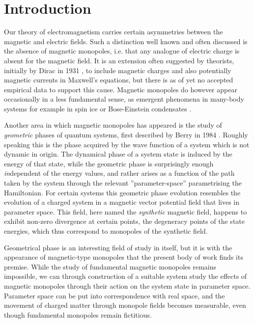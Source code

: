 \documentclass[main.tex]{subfiles}
\begin{document}
\section{Introduction}
\label{sec:introduction}
Our theory of electromagnetism carries certain asymmetries between the magnetic and
electric fields. Such a distinction well known and often discussed is the absence of
magnetic monopoles, i.e. that
any analogue of electric charge is absent for the magnetic field. It is an extension often
suggested by theorists, initially by Dirac in 1931 \cite{dirac}, to include magnetic
charges and also potentially magnetic currents in Maxwell's equations, but
there is as of yet no accepted empirical data to support this cause. Magnetic monopoles do
however appear occasionally in a less fundamental sense, as emergent phenomena in
many-body systems for example in
spin ice \cite{castelnovo} or Bose-Einstein condensates \cite{ray}. 

Another area in which magnetic monopoles has appeared is the study of \textit{geometric}
phases of quantum systems, first described by Berry in 1984 \cite{berry1984}. Roughly
speaking this is the phase acquired by the wave function of a system which is not dynamic
in origin. The dynamical phase of a system state is induced by the energy of that state,
while the geometric phase is surprisingly enough \textit{in}dependent of the energy values,
and rather arises as a function of the path taken by the system through the relevant
''parameter-space'' parametrising the Hamiltonian. For certain systems this geometric phase evolution
resembles the %
evolution of a charged system in a magnetic vector potential field that lives in 
parameter space. This field, here named the \textit{synthetic} magnetic field, happens to
exhibit non-zero divergence at certain points, the degeneracy points of the state energies,
which thus correspond to monopoles of the synthetic field.

Geometrical phase is an interesting field of study in itself, but it is with the
appearance of magnetic-type monopoles that the present body of work finds its premise.
While the study of fundamental magnetic monopoles remains impossible, we can through construction of
a suitable system study the effects of magnetic monopoles through their action on the
system state in parameter space. Parameter space can be put into correspondence with real
space, and the movement of charged matter through monopole fields
becomes measurable, even though fundamental monopoles remain fictitious.
\end{document}
